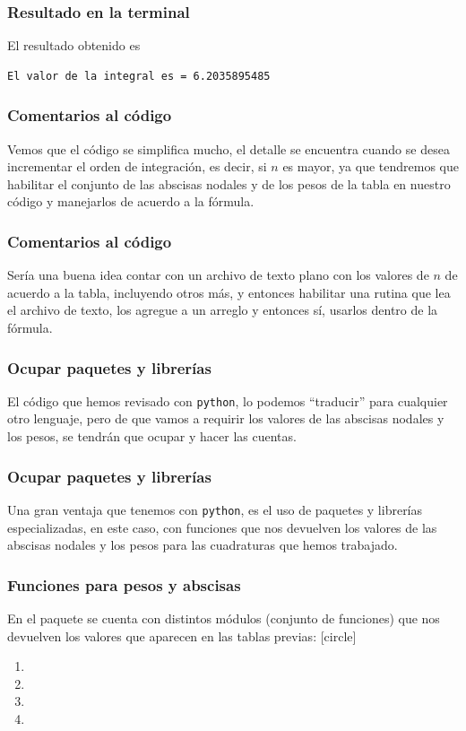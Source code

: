 \begin{frame}[fragile]
\frametitle{Resultado en la terminal}
El resultado obtenido es
\begin{verbatim}
El valor de la integral es = 6.2035895485
\end{verbatim}
\end{frame}
\begin{frame}
\frametitle{Comentarios al código}
Vemos que el código se simplifica mucho, el detalle se encuentra cuando se desea incrementar el orden de integración, es decir, si $n$ es mayor, ya que tendremos que habilitar el conjunto de las abscisas nodales y de los pesos de la tabla en nuestro código y manejarlos de acuerdo a la fórmula.
\end{frame}
\begin{frame}
\frametitle{Comentarios al código}
Sería una buena idea contar con un archivo de texto plano con los valores de $n$ de acuerdo a la tabla, incluyendo otros más, y entonces habilitar una rutina que lea el archivo de texto, los agregue a un arreglo y entonces sí, usarlos dentro de la fórmula.
\end{frame}
\begin{frame}
\frametitle{Ocupar paquetes y librerías}
El código que hemos revisado con \texttt{python}, lo podemos \enquote{traducir} para cualquier otro lenguaje, pero de que vamos a requirir los valores de las abscisas nodales y los pesos, se tendrán que ocupar y hacer las cuentas.
\end{frame}
\begin{frame}
\frametitle{Ocupar paquetes y librerías}
Una gran ventaja que tenemos con \texttt{python}, es el uso de paquetes y librerías especializadas, en este caso, con funciones que nos devuelven los valores de las abscisas nodales y los pesos para las cuadraturas que hemos trabajado.
\end{frame}
\begin{frame}
\frametitle{Funciones para pesos y abscisas}
En el paquete  se cuenta con distintos módulos (conjunto de funciones) que nos devuelven los valores que aparecen en las tablas previas:
[circle]
\begin{enumerate}[<+->]
\item {}
\item {}
\item {}
\item {}
\end{enumerate}
\end{frame}
